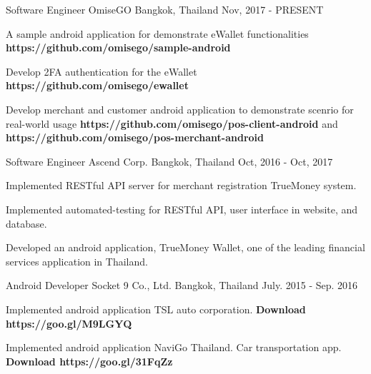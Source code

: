 

\begin{cventries}

  \cventry
    {Software Engineer}
    {OmiseGO}
    {Bangkok, Thailand}
    {Nov, 2017 - PRESENT}
    {
      \begin{cvitems}
        \item {A sample android application for demonstrate eWallet functionalities \textbf{https://github.com/omisego/sample-android}}
        \item {Develop 2FA authentication for the eWallet \textbf{https://github.com/omisego/ewallet}}  
        \item {Develop merchant and customer android application to demonstrate scenrio for real-world usage \textbf{https://github.com/omisego/pos-client-android} and \textbf{https://github.com/omisego/pos-merchant-android}}
      \end{cvitems}
    }

  \cventry
    {Software Engineer} %
    {Ascend Corp.} %
    {Bangkok, Thailand} %
    {Oct, 2016 - Oct, 2017} %
    {
      \begin{cvitems} %
        \item {Implemented RESTful API server for merchant registration TrueMoney system.}
        \item {Implemented automated-testing for RESTful API, user interface in website, and database.}
        \item {Developed an android application, TrueMoney Wallet, one of the leading financial services application in Thailand.}
      \end{cvitems}
    }

  \cventry
    {Android Developer} %
    {Socket 9 Co., Ltd.} %
    {Bangkok, Thailand} %
    {July. 2015 - Sep. 2016} %
    {
      \begin{cvitems} %
        \item {Implemented android application TSL auto corporation. \textbf{Download https://goo.gl/M9LGYQ}}
        \item {Implemented android application NaviGo Thailand. Car transportation app. \textbf{Download https://goo.gl/31FqZz}}
      \end{cvitems}
    }

\end{cventries}
